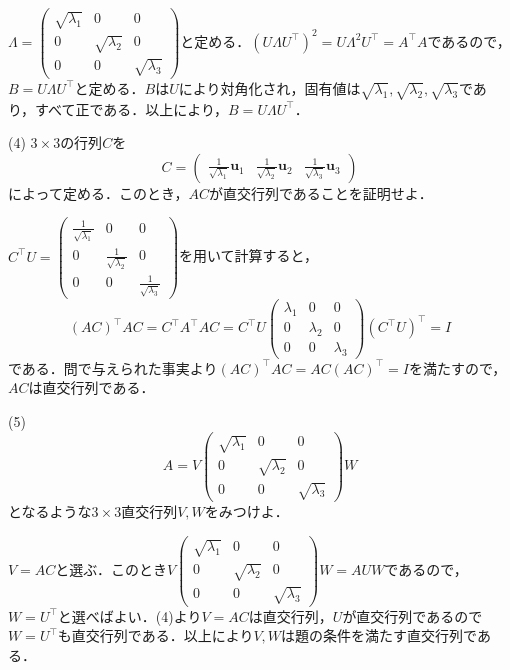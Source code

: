 \documentclass[a4j]{jarticle}
\begin{document}
$\Lambda=\begin{pmatrix}
\sqrt{\lambda_1}& 0&  0\\
0&  \sqrt{\lambda_2}& 0\\
0& 0&  \sqrt{\lambda_3}
\end{pmatrix}$と定める．$(U\Lambda U^\top)^2=U\Lambda^2 U^\top=A^\top A$であるので，$B=U\Lambda U^\top$と定める．$B$は$U$により対角化され，固有値は$\sqrt{\lambda_1},\sqrt{\lambda_2},\sqrt{\lambda_3}$であり，すべて正である．以上により，$B=U\Lambda U^\top$．
\begin{screen}
(4)
$3 \times 3$の行列$C$を
$$ C=\begin{pmatrix}
\frac{1}{\sqrt{\lambda_1}}\bm{u}_1 & \frac{1}{\sqrt{\lambda_2}}\bm{u}_2 & \frac{1}{\sqrt{\lambda_3}}\bm{u}_3 
\end{pmatrix}$$
によって定める．このとき，$AC$が直交行列であることを証明せよ．
\end{screen}


$C^\top U = \begin{pmatrix}
\frac{1}{\sqrt{\lambda_1}}& 0&  0\\
0&  \frac{1}{\sqrt{\lambda_2}}& 0\\
0& 0&  \frac{1}{\sqrt{\lambda_3}}
\end{pmatrix}$を用いて計算すると，
$$(AC)^\top AC = C^\top A^\top AC =C^\top U
\begin{pmatrix}
\lambda_1& 0&  0\\
0&  \lambda_2& 0\\
0& 0&  \lambda_3
\end{pmatrix}
(C^\top U)^\top=I$$である．問で与えられた事実より$(AC)^\top AC=AC(AC)^\top=I$を満たすので，$AC$は直交行列である．
\begin{screen}
(5)
$$A=V\begin{pmatrix}
\sqrt{\lambda_1}& 0&  0\\
0&  \sqrt{\lambda_2}& 0\\
0& 0&  \sqrt{\lambda_3}
\end{pmatrix}W$$
となるような$3 \times 3$直交行列$V,W$をみつけよ．
\end{screen}


$V=AC$と選ぶ．このとき$V\begin{pmatrix}
\sqrt{\lambda_1}& 0&  0\\
0&  \sqrt{\lambda_2}& 0\\
0& 0&  \sqrt{\lambda_3}
\end{pmatrix}W=AUW$であるので，$W=U^\top$と選べばよい．(4)より$V=AC$は直交行列，$U$が直交行列であるので$W=U^\top$も直交行列である．以上により$V,W$は題の条件を満たす直交行列である．
\end{document}
